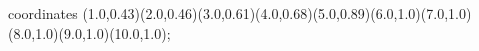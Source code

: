 					coordinates { (1.0,0.43)(2.0,0.46)(3.0,0.61)(4.0,0.68)(5.0,0.89)(6.0,1.0)(7.0,1.0)(8.0,1.0)(9.0,1.0)(10.0,1.0)};